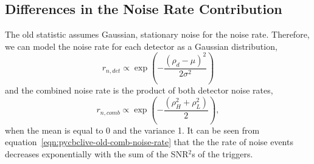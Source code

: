 \subsection{\label{sec:pycbclive-noise-contrib}Differences in the Noise Rate Contribution}


The old statistic assumes Gaussian, stationary noise for the noise rate. Therefore, we can model the noise rate for each detector as a Gaussian distribution,
%
\begin{equation}
    r_{n,det} \propto \exp \left( -\frac{(\rho_d - \mu)^2}{2 \sigma^2} \right)
    \label{eqn:pycbclive-old-noise-rate}
\end{equation}
%
and the combined noise rate is the product of both detector noise rates,
%
\begin{equation}
    r_{n,comb} \propto \exp \left( -\frac{(\rho_{H}^{2} + \rho_{L}^{2})}{2} \right) ,
    \label{eqn:pycbclive-old-comb-noise-rate}
\end{equation}
%
when the mean is equal to 0 and the variance 1. It can be seen from equation~\ref{eqn:pycbclive-old-comb-noise-rate} that the the rate of noise events decreases exponentially with the sum of the SNR$^{2}$s of the triggers.

